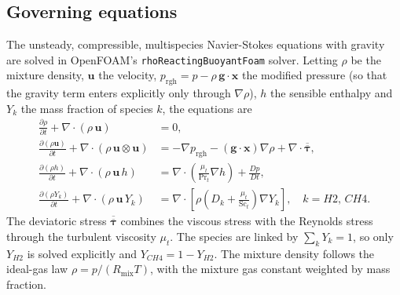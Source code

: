 \documentclass[11pt,a4paper]{article}
\def\Hi{H2}%
\def\CHi{CH4}%
\newcommand{\Hi}{\ensuremath{\mathrm{H_2}}}
\newcommand{\CHi}{\ensuremath{\mathrm{CH_4}}}
\begin{document}
\subsection{Governing equations}
\label{sec:method_govern}
The unsteady, compressible, multispecies Navier-Stokes equations
with gravity are solved in OpenFOAM's \texttt{rhoReactingBuoyantFoam}
solver. Letting \(\rho\) be the mixture density, \(\mathbf{u}\) the
velocity, \(p_{\mathrm{rgh}} = p - \rho\,\mathbf{g}\!\cdot\!\mathbf{x}\)
the modified pressure (so that the gravity term enters explicitly
only through \(\nabla\rho\)), \(h\) the sensible enthalpy and
\(Y_k\) the mass fraction of species \(k\), the equations are
\begin{align}
\frac{\partial\rho}{\partial t} +
\nabla\!\cdot\!(\rho\,\mathbf{u}) &= 0,
\label{eq:cont}\\[2pt]
\frac{\partial(\rho\mathbf{u})}{\partial t} +
\nabla\!\cdot\!(\rho\,\mathbf{u}\!\otimes\!\mathbf{u})
&= -\nabla p_{\mathrm{rgh}}
- (\mathbf{g}\!\cdot\!\mathbf{x})\nabla\rho
+\nabla\!\cdot\!\overline{\overline{\boldsymbol{\tau}}},
\label{eq:mom}\\[2pt]
\frac{\partial(\rho h)}{\partial t} +
\nabla\!\cdot\!(\rho\,\mathbf{u}\,h)
&=\nabla\!\cdot\!\left(\frac{\mu_t}{\mathrm{Pr}_t}\nabla h\right)
+\frac{Dp}{Dt},
\label{eq:enth}\\[2pt]
\frac{\partial(\rho Y_k)}{\partial t} +
\nabla\!\cdot\!(\rho\,\mathbf{u}\,Y_k)
&=\nabla\!\cdot\!\left[\rho\!\left(D_k+\frac{\mu_t}{\mathrm{Sc}_t}\right)
\nabla Y_k\right],\quad k = \Hi,\,\CHi.
\label{eq:species}
\end{align}
The deviatoric stress \(\overline{\overline{\boldsymbol{\tau}}}\)
combines the viscous stress with the Reynolds stress through the
turbulent viscosity \(\mu_t\). The species are linked by
\(\sum_k Y_k = 1\), so only \(Y_{\Hi}\) is solved explicitly and
\(Y_{\CHi}=1-Y_{\Hi}\). The mixture density follows the ideal-gas
law \(\rho = p/(R_{\mathrm{mix}}T)\), with the mixture gas constant
weighted by mass fraction.
\end{document}
